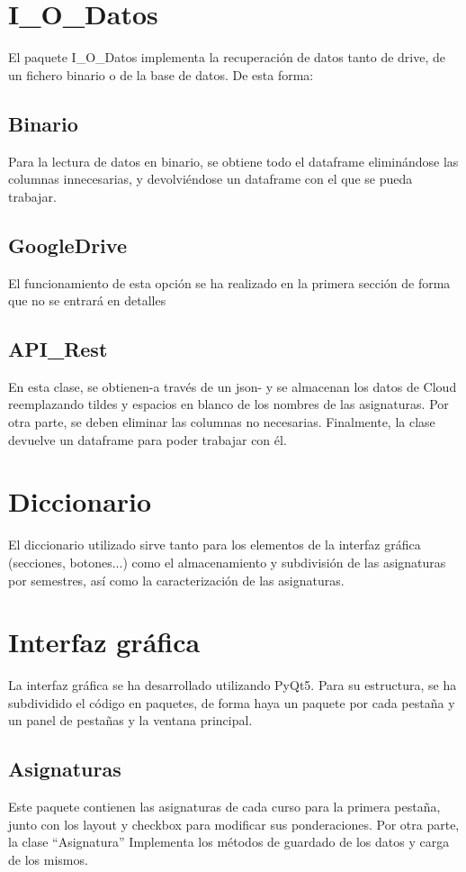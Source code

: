 \section{I\_O\_Datos}
El paquete I\_O\_Datos implementa la recuperación de datos tanto de drive, de un fichero binario o de la base de datos. De esta forma:
\subsection{Binario}
Para la lectura de datos en binario, se obtiene todo el dataframe eliminándose las columnas innecesarias,  y devolviéndose un dataframe con el que se pueda trabajar. 

\subsection{GoogleDrive}
El funcionamiento de esta opción se ha realizado en la primera sección de forma que no se entrará en detalles

\subsection{API\_Rest}
En esta clase, se obtienen-a través de un json- y se almacenan los datos de Cloud reemplazando tildes y espacios en blanco de los nombres de las asignaturas. Por otra parte, se deben eliminar las columnas no necesarias. 
Finalmente, la clase devuelve un dataframe para poder trabajar con él. 

\section{Diccionario}
El diccionario utilizado sirve tanto para los elementos de la interfaz gráfica (secciones, botones...) como el almacenamiento y subdivisión de las asignaturas por semestres, así como la caracterización de las asignaturas. 

\section{Interfaz gráfica}
La interfaz gráfica se ha desarrollado utilizando PyQt5. Para su estructura, se ha subdividido el código en paquetes, de forma haya un paquete por cada pestaña y un panel de pestañas y la ventana principal. 
\subsection{Asignaturas}
Este paquete contienen las asignaturas de cada curso para la primera pestaña, junto con los layout y checkbox para modificar sus ponderaciones. Por otra parte, la clase ``Asignatura'' Implementa los métodos de guardado de los datos y carga de los mismos. 

